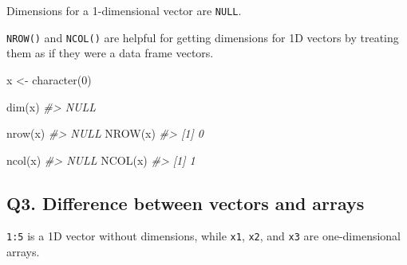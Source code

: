 \documentclass[
]{book}
\newenvironment{Shaded}{\begin{snugshade}}{\end{snugshade}}
\newcommand{\CommentTok}[1]{\textcolor[rgb]{0.56,0.35,0.01}{\textit{#1}}}
\newcommand{\DecValTok}[1]{\textcolor[rgb]{0.00,0.00,0.81}{#1}}
\newcommand{\FunctionTok}[1]{\textcolor[rgb]{0.00,0.00,0.00}{#1}}
\newcommand{\NormalTok}[1]{#1}
\newcommand{\OtherTok}[1]{\textcolor[rgb]{0.56,0.35,0.01}{#1}}
\begin{document}
Dimensions for a 1-dimensional vector are \texttt{NULL}.

\texttt{NROW()} and \texttt{NCOL()} are helpful for getting dimensions for 1D vectors by treating them as if they were a data frame vectors.

\begin{Shaded}
\begin{Highlighting}[]
\NormalTok{x }\OtherTok{\textless{}{-}} \FunctionTok{character}\NormalTok{(}\DecValTok{0}\NormalTok{)}

\FunctionTok{dim}\NormalTok{(x)}
\CommentTok{\#\textgreater{} NULL}

\FunctionTok{nrow}\NormalTok{(x)}
\CommentTok{\#\textgreater{} NULL}
\FunctionTok{NROW}\NormalTok{(x)}
\CommentTok{\#\textgreater{} [1] 0}

\FunctionTok{ncol}\NormalTok{(x)}
\CommentTok{\#\textgreater{} NULL}
\FunctionTok{NCOL}\NormalTok{(x)}
\CommentTok{\#\textgreater{} [1] 1}
\end{Highlighting}
\end{Shaded}

\hypertarget{q3.-difference-between-vectors-and-arrays}{%
\subsection*{Q3. Difference between vectors and arrays}\label{q3.-difference-between-vectors-and-arrays}}

\texttt{1:5} is a 1D vector without dimensions, while \texttt{x1}, \texttt{x2}, and \texttt{x3} are one-dimensional arrays.
\end{document}
